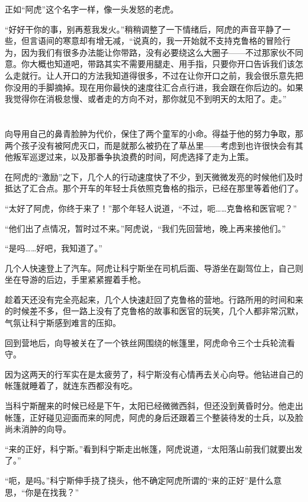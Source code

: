 正如“阿虎”这个名字一样，像一头发怒的老虎。

“好好干你的事，别再惹我发火。”稍稍调整了一下情绪后，阿虎的声音平静了一些，但言语间的寒意却有增无减，“说真的，我一开始就不支持克鲁格的冒险行为，因为我们有很多办法能让你带路，没有必要绕这么大圈子——不过那家伙不同意。你大概也知道吧，带路其实不需要用腿走、用手指，只要你开口告诉我们该怎么走就行。让人开口的方法我知道得很多，不过在让你开口之前，我会很乐意先把你没用的手脚摘掉。现在用你最快的速度往汇合点行进，我会跟在你后边的。如果我觉得你在消极怠慢、或者走的方向不对，那你就见不到明天的太阳了。走。”



\section*{}

向导用自己的鼻青脸肿为代价，保住了两个童军的小命。得益于他的努力争取，那两个孩子没有被阿虎灭口，而是就那么被扔在了草丛里——考虑到也许很快会有其他叛军巡逻过来，以及那番争执浪费的时间，阿虎选择了走为上策。

在阿虎的“激励”之下，几个人的行动速度快了不少，到天微微发亮的时候他们及时抵达了汇合点。那个开车的年轻士兵依照克鲁格的指示，已经在那里等着他们了。

“太好了阿虎，你终于来了！”那个年轻人说道，“不过，呃……克鲁格和医官呢？”

“他们出了点情况，暂时过不来。”阿虎说，“我们先回营地，晚上再来接他们。”

“是吗……好吧，我知道了。”

几个人快速登上了汽车。阿虎让科宁斯坐在司机后面、导游坐在副驾位上，自己则坐在导游的后边，手里紧紧握着手枪。

趁着天还没有完全亮起来，几个人快速赶回了克鲁格的营地。行路所用的时间和来的时候差不多，但一路上没有了克鲁格的故事和医官的玩笑，几个人都非常沉默，气氛让科宁斯感到难言的压抑。

回到营地后，向导被关在了一个铁丝网围绕的帐篷里，阿虎命令三个士兵轮流看守。

因为这两天的行军实在是太疲劳了，科宁斯没有心情再去关心向导。他钻进自己的帐篷就睡着了，就连东西都没有吃。

当科宁斯醒来的时候已经是下午，太阳已经微微西斜，但还没到黄昏时分。他走出帐篷，正好碰见迎面而来的阿虎，阿虎的身后还跟着三个整装待发的士兵，以及脸尚未消肿的向导。

“来的正好，科宁斯。”看到科宁斯走出帐篷，阿虎说道，“太阳落山前我们就要出发了。”

“呃，是吗。”科宁斯伸手挠了挠头，他不确定阿虎所谓的“来的正好”是什么意思，“你是在找我？”

